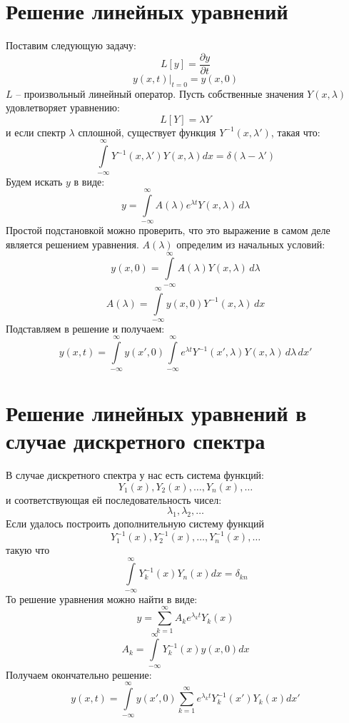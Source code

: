 \section{Решение линейных уравнений}

Поставим следующую задачу:
\[
	L\left[y\right] = \frac{\partial y}{\partial t} 
\]
\[
	y(x, t)\Big|_{t = 0} = y(x, 0) 
\]
$L$ -- произвольный линейный оператор.
Пусть собственные значения $Y(x, \lambda)$ удовлетворяет уравнению:
\[
	L\left[Y\right] = \lambda Y
\]
и если спектр $\lambda$ сплошной, существует функция $Y^{-1}(x, \lambda')$, такая что:
\[
	\int\limits_{-\infty}^{\infty} Y^{-1}(x, \lambda') Y(x, \lambda) dx = \delta(\lambda - \lambda')
\]
Будем искать $y$ в виде:
\[
	y = \int\limits_{-\infty}^{\infty} A(\lambda) e^{\lambda t} Y(x, \lambda)\, d\lambda
\]
Простой подстановкой можно проверить, что это выражение в самом деле является решением уравнения. $A(\lambda)$ определим из начальных условий:
\[
	y(x, 0) = \int\limits_{-\infty}^{\infty} A(\lambda) Y(x, \lambda)\, d\lambda
\]
\[
	A(\lambda) = \int\limits_{-\infty}^{\infty} y(x, 0) Y^{-1}(x, \lambda)\, dx
\]
Подставляем в решение и получаем:
\[
	y(x, t) = \int\limits_{-\infty}^{\infty} y(x', 0) \int\limits_{-\infty}^{\infty} e^{\lambda t}Y^{-1}(x', \lambda) Y(x, \lambda)\, d\lambda\, dx'
\]

\section{Решение линейных уравнений в случае дискретного спектра}

В случае дискретного спектра у нас есть система функций:
\[
	Y_1(x), Y_2(x), \ldots, Y_n(x), \ldots
\]
и соответствующая ей последовательность чисел:
\[
	\lambda_1, \lambda_2, \ldots
\]
Если удалось построить дополнительную систему функций
\[
	Y_1^{-1}(x), Y_2^{-1}(x), \ldots, Y_n^{-1}(x), \ldots
\]
такую что
\[
	\int\limits_{-\infty}^{\infty} Y_k^{-1}(x) Y_n(x) dx = \delta_{kn}
\]
То решение уравнения можно найти в виде:
\[
	y = \sum_{k=1}^{\infty} A_k e^{\lambda_k t} Y_k(x)
\]
\[
	A_k = \int\limits_{-\infty}^{\infty} Y_k^{-1}(x) y(x, 0) dx
\]
Получаем окончательно решение:
\[
	y(x, t) = \int\limits_{-\infty}^{\infty} y(x', 0) \sum_{k=1}^{\infty} e^{\lambda_k t} Y_k^{-1}(x') Y_k(x) dx'
\]